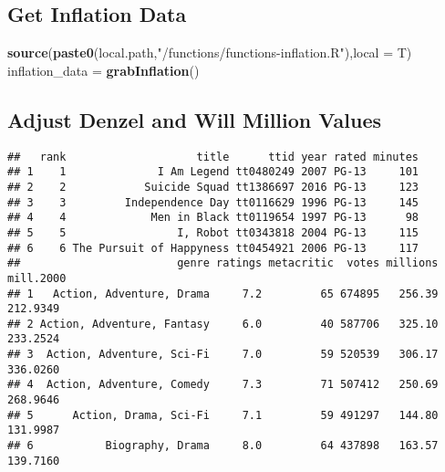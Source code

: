 \documentclass[
]{article}
\newenvironment{Shaded}{\begin{snugshade}}{\end{snugshade}}
\newcommand{\DataTypeTok}[1]{\textcolor[rgb]{0.13,0.29,0.53}{#1}}
\newcommand{\FloatTok}[1]{\textcolor[rgb]{0.00,0.00,0.81}{#1}}
\newcommand{\KeywordTok}[1]{\textcolor[rgb]{0.13,0.29,0.53}{\textbf{#1}}}
\newcommand{\NormalTok}[1]{#1}
\newcommand{\OperatorTok}[1]{\textcolor[rgb]{0.81,0.36,0.00}{\textbf{#1}}}
\newcommand{\StringTok}[1]{\textcolor[rgb]{0.31,0.60,0.02}{#1}}
\begin{document}
\begin{Shaded}
\begin{Highlighting}[]
\hypertarget{get-inflation-data}{%
\subsection{Get Inflation Data}\label{get-inflation-data}}

\begin{Shaded}
\begin{Highlighting}[]
\KeywordTok{source}\NormalTok{(}\KeywordTok{paste0}\NormalTok{(local.path,}\StringTok{"/functions/functions-inflation.R"}\NormalTok{),}\DataTypeTok{local =}\NormalTok{ T)}
\NormalTok{inflation_data =}\StringTok{ }\KeywordTok{grabInflation}\NormalTok{()}
\end{Highlighting}
\end{Shaded}

\hypertarget{adjust-denzel-and-will-million-values}{%
\subsection{Adjust Denzel and Will Million
Values}\label{adjust-denzel-and-will-million-values}}

\begin{Shaded}
\end{Shaded}

\begin{verbatim}
##   rank                    title      ttid year rated minutes
## 1    1              I Am Legend tt0480249 2007 PG-13     101
## 2    2            Suicide Squad tt1386697 2016 PG-13     123
## 3    3         Independence Day tt0116629 1996 PG-13     145
## 4    4             Men in Black tt0119654 1997 PG-13      98
## 5    5                 I, Robot tt0343818 2004 PG-13     115
## 6    6 The Pursuit of Happyness tt0454921 2006 PG-13     117
##                        genre ratings metacritic  votes millions mill.2000
## 1   Action, Adventure, Drama     7.2         65 674895   256.39  212.9349
## 2 Action, Adventure, Fantasy     6.0         40 587706   325.10  233.2524
## 3  Action, Adventure, Sci-Fi     7.0         59 520539   306.17  336.0260
## 4  Action, Adventure, Comedy     7.3         71 507412   250.69  268.9646
## 5      Action, Drama, Sci-Fi     7.1         59 491297   144.80  131.9987
## 6           Biography, Drama     8.0         64 437898   163.57  139.7160
\end{verbatim}


\end{Highlighting}
\end{Shaded}
\end{document}
